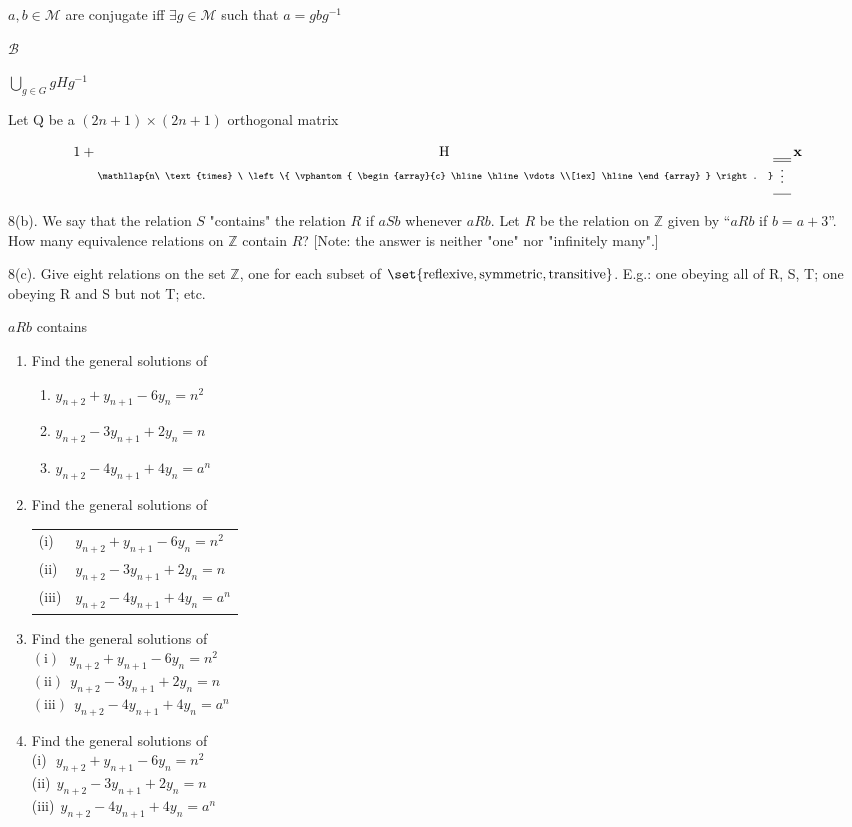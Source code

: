 \documentclass{article}
\newcommand*\tensordim[2]{
 \underset{
  \mathllap{#2\ \text{times}
  \ \left\{
   \vphantom{
    \begin{array}{c}
     \hline \hline \vdots \\[1ex] \hline
    \end{array}
   } \right.
  }
  \begin{array}{c}
   \hline \hline \vdots \\[1ex] \hline
  \end{array}
 }
 {\mathrm #1}
}
\begin{document}
\(a, b \in \mathcal M\) are conjugate iff \(\mathop\exists g \in \mathcal M\) such that \(a = g b g^{-1}\)

\(\mathscr B\)

\(\bigcup\limits_{g \in G} g H g^{-1}\)

Let Q be a \((2n+1)\times(2n+1)\) orthogonal matrix

\begin{equation*}
 1 + \tensordim{H}{n} \,\mathbf x
\end{equation*}

8(b). We say that the relation \(S\) "contains" the relation \(R\) if \(aSb\)
whenever \(aRb\).  Let \(R\) be the relation on \(\mathbb Z\) given by ``\(aRb\)
if \(b = a + 3\)''.  How many equivalence relations on \(\mathbb Z\) contain
\(R\)?  [Note: the answer is neither "one" nor "infinitely many".]

8(c). Give eight relations on the set \(\mathbb Z\), one for each subset of
\(\set{\text{reflexive}, \text{symmetric}, \text{transitive}}\).  E.g.: one
obeying all of R, S, T; one obeying R and S but not T; etc.


\(a R b\) contains

\begin{enumerate}
 \item Find the general solutions of
\begin{enumerate}[label=(\roman*)]
 \item \(y_{n + 2} + y_{n + 1} - 6 y_n = n^2\)
 \item \(y_{n + 2} - 3 y_{n + 1} + 2 y_n = n\)
 \item \(y_{n + 2} - 4 y_{n + 1} + 4 y_n = a^n\)
\end{enumerate}

\item Find the general solutions of \\
\begin{tabular}{ll}
  (i) & \(y_{n + 2} + y_{n + 1} - 6 y_n = n^2\) \\
 (ii) & \(y_{n + 2} - 3 y_{n + 1} + 2 y_n = n\) \\
(iii) & \(y_{n + 2} - 4 y_{n + 1} + 4 y_n = a^n\) \\
\end{tabular}

\item Find the general solutions of \\
\(  (\mathrm{i})\ \ \  y_{n + 2} + y_{n + 1} - 6 y_n = n^2\) \\
\( (\mathrm{ii})\ \  y_{n + 2} - 3 y_{n + 1} + 2 y_n = n\) \\
\((\mathrm{iii})\ \ y_{n + 2} - 4 y_{n + 1} + 4 y_n = a^n\)

\item Find the general solutions of \\
 (i)\(\ \ \  y_{n + 2} + y_{n + 1} - 6 y_n = n^2\) \\
 (ii)\(\ \  y_{n + 2} - 3 y_{n + 1} + 2 y_n = n\) \\
 (iii)\(\ \  y_{n + 2} - 4 y_{n + 1} + 4 y_n = a^n\)
\end{enumerate}
\end{document}
